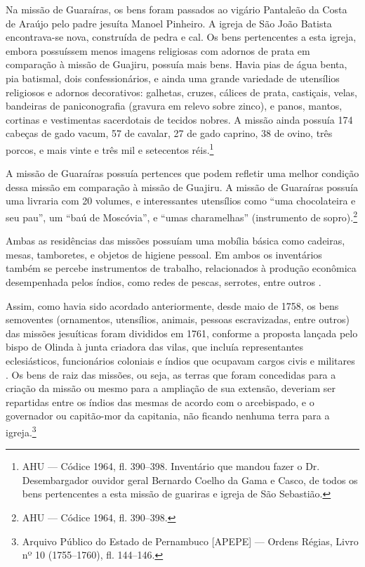 Na missão de Guaraíras, os bens foram passados ao vigário Pantaleão da Costa de Araújo pelo padre jesuíta Manoel Pinheiro. A igreja de São João Batista encontrava-se nova, construída de pedra e cal. Os bens pertencentes a esta igreja, embora possuíssem menos imagens religiosas com adornos de prata em comparação à missão de Guajiru, possuía mais bens. Havia pias de água benta, pia batismal, dois confessionários, e ainda uma grande variedade de utensílios religiosos e adornos decorativos: galhetas, cruzes, cálices de prata, castiçais, velas, bandeiras de paniconografia (gravura em relevo sobre zinco), e panos, mantos, cortinas e vestimentas sacerdotais de tecidos nobres. A missão ainda possuía 174 cabeças de gado vacum, 57 de cavalar, 27 de gado caprino, 38 de ovino, três porcos, e mais vinte e três mil e setecentos réis.\footnote{AHU --- Códice 1964, fl. 390--398. Inventário que mandou fazer o Dr. Desembargador ouvidor geral Bernardo Coelho da Gama e Casco, de todos os bens pertencentes a esta missão de guariras e igreja de São Sebastião.}  

A missão de Guaraíras possuía pertences que podem refletir uma melhor condição dessa missão em comparação à missão de Guajiru. A missão de Guaraíras possuía uma livraria com 20 volumes, e interessantes utensílios como “uma chocolateira e seu pau”, um “baú de Moscóvia”, e “umas charamelhas” (instrumento de sopro).\footnote{AHU --- Códice 1964, fl. 390--398.} 

Ambas as residências das missões possuíam uma mobília básica como cadeiras, mesas, tamboretes, e objetos de higiene pessoal. Em ambos os inventários também se percebe instrumentos de trabalho, relacionados à produção econômica desempenhada pelos índios, como redes de pescas, serrotes, entre outros \cite[p.~173]{Lopes2005}. 

Assim, como havia sido acordado anteriormente, desde maio de 1758, os bens semoventes (ornamentos, utensílios, animais, pessoas escravizadas, entre outros) das missões jesuíticas foram divididos em 1761, conforme a proposta lançada pelo bispo de Olinda à junta criadora das vilas, que incluía representantes eclesiásticos, funcionários coloniais e índios que ocupavam cargos civis e militares \cite[p.~179]{Lopes2005}. Os bens de raiz das missões, ou seja, as terras que foram concedidas para a criação da missão ou mesmo para a ampliação de sua extensão, deveriam ser repartidas entre os índios das mesmas de acordo com o arcebispado, e o governador ou capitão-mor da capitania, não ficando nenhuma terra para a igreja.\footnote{Arquivo Público do Estado de Pernambuco [APEPE] --- Ordens Régias, Livro nº 10 (1755--1760), fl. 144--146. }

